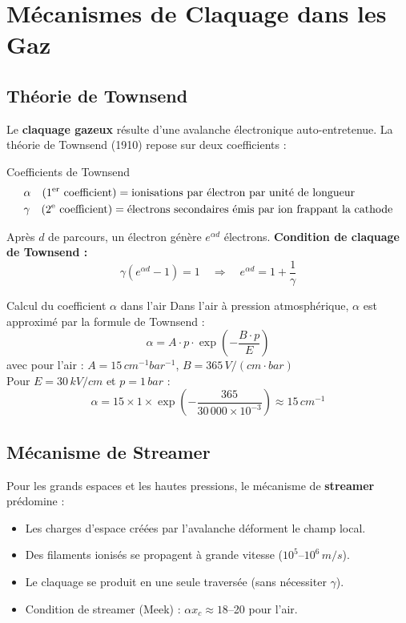\documentclass[12pt, a4paper, twoside]{report}
\begin{document}
\section{Mécanismes de Claquage dans les Gaz}

\subsection{Théorie de Townsend}

Le \textbf{claquage gazeux} résulte d'une avalanche électronique auto-entretenue.
La théorie de Townsend (1910) repose sur deux coefficients :

\begin{formulebox}{Coefficients de Townsend}
\begin{align}
  &\alpha \quad \text{(1\textsuperscript{er} coefficient)} = \text{ionisations par électron par unité de longueur} \\
  &\gamma \quad \text{(2\textsuperscript{e} coefficient)} = \text{électrons secondaires émis par ion frappant la cathode}
\end{align}

Après $d$ de parcours, un électron génère $e^{\alpha d}$ électrons.
\textbf{Condition de claquage de Townsend :}
\[
  \gamma\left(e^{\alpha d} - 1\right) = 1
  \quad \Longrightarrow \quad
  e^{\alpha d} = 1 + \frac{1}{\gamma}
\]
\end{formulebox}

\begin{exemple}{Calcul du coefficient $\alpha$ dans l'air}
Dans l'air à pression atmosphérique, $\alpha$ est approximé par la formule de Townsend :
\[
  \alpha = A \cdot p \cdot \exp\!\left(-\frac{B\cdot p}{E}\right)
\]
avec pour l'air : $A = 15\,\si{cm^{-1}bar^{-1}}$, $B = 365\,\si{V/(cm\cdot bar)}$\\[6pt]
Pour $E = 30\,\si{kV/cm}$ et $p = 1\,\si{bar}$ :
\[
  \alpha = 15 \times 1 \times \exp\!\left(-\frac{365}{30\,000 \times 10^{-3}}\right)
  \approx 15\,\si{cm^{-1}}
\]
\end{exemple}

\subsection{Mécanisme de Streamer}

Pour les grands espaces et les hautes pressions, le mécanisme de \textbf{streamer} prédomine :
\begin{itemize}
  \item Les charges d'espace créées par l'avalanche déforment le champ local.
  \item Des filaments ionisés se propagent à grande vitesse ($10^5$--$10^6\,\si{m/s}$).
  \item Le claquage se produit en une seule traversée (sans nécessiter $\gamma$).
  \item Condition de streamer (Meek) : $\alpha x_c \approx 18$--20 pour l'air.
\end{itemize}
\end{document}
